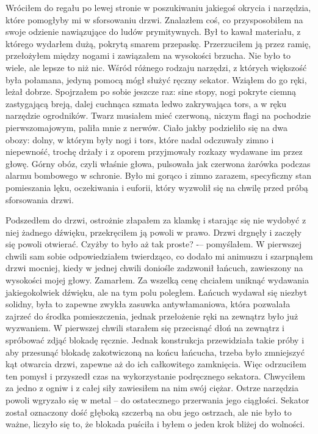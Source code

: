 Wróciłem do regału po lewej stronie w poszukiwaniu jakiegoś okrycia i narzędzia, które pomogłyby mi w sforsowaniu drzwi. Znalazłem coś, co przysposobiłem na swoje odzienie nawiązujące do ludów prymitywnych. Był to kawał materiału, z którego wydarłem dużą, pokrytą smarem przepaskę. Przerzuciłem ją przez ramię, przełożyłem między nogami i zawiązałem na wysokości brzucha. Nie było to wiele, ale lepsze to niż nic. Wśród różnego rodzaju narzędzi, z których większość była połamana, jedyną pomocą mógł służyć ręczny sekator. Wziąłem do go ręki, leżał dobrze. Spojrzałem po sobie jeszcze raz: sine stopy, nogi pokryte ciemną zastygającą breją, dalej cuchnąca szmata ledwo zakrywająca tors, a w ręku narzędzie ogrodników. Twarz musiałem mieć czerwoną, niczym flagi na pochodzie pierwszomajowym, paliła mnie z nerwów. Ciało jakby podzieliło się na dwa obozy: dolny, w którym były nogi i tors, które nadal odczuwały zimno i niepewność, trochę drżały i z oporem przyjmowały rozkazy wydawane im przez głowę. Górny obóz, czyli właśnie głowa, pulsowała jak czerwona żarówka podczas alarmu bombowego w schronie. Było mi gorąco i zimno zarazem, specyficzny stan pomieszania lęku, oczekiwania i euforii, który wyzwolił się na chwilę przed próbą sforsowania drzwi.

Podszedłem do drzwi, ostrożnie złapałem za klamkę i starając się nie wydobyć z niej żadnego dźwięku, przekręciłem ją powoli w prawo. Drzwi drgnęły i zaczęły się powoli otwierać. Czyżby to było aż tak proste? -– pomyślałem. W pierwszej chwili sam sobie odpowiedziałem twierdząco, co dodało mi animuszu i szarpnąłem drzwi mocniej, kiedy w jednej chwili doniośle zadzwonił łańcuch, zawieszony na wysokości mojej głowy. Zamarłem. Za wszelką cenę chciałem uniknąć wydawania jakiegokolwiek dźwięku, ale na tym polu poległem. Łańcuch wydawał się niezbyt solidny, była to zapewne zwykła zasuwka antywłamaniowa, która pozwalała zajrzeć do środka pomieszczenia, jednak przełożenie ręki na zewnątrz było już wyzwaniem. W pierwszej chwili starałem się przecisnąć dłoń na zewnątrz i spróbować zdjąć blokadę ręcznie. Jednak konstrukcja przewidziała takie próby i aby przesunąć blokadę zakotwiczoną na końcu łańcucha, trzeba było zmniejszyć kąt otwarcia drzwi, zapewne aż do ich całkowitego zamknięcia. Więc odrzuciłem ten pomysł i przyszedł czas na wykorzystanie podręcznego sekatora. Chwyciłem za jedno z ogniw i z całej siły zawiesiłem na nim swój ciężar. Ostrze narzędzia powoli wgryzało się w metal -- do ostatecznego przerwania jego ciągłości. Sekator został oznaczony dość głęboką szczerbą na obu jego ostrzach, ale nie było to ważne, liczyło się to, że blokada puściła i byłem o jeden krok bliżej do wolności.

